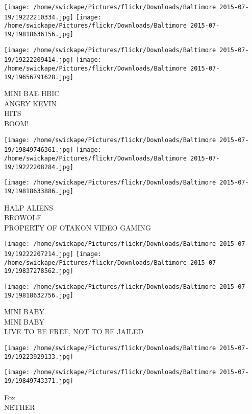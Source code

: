 \documentclass[10pt,letterpaper]{article}
\begin{document}
\texttt{[image: /home/swickape/Pictures/flickr/Downloads/Baltimore 2015-07-19/19222210334.jpg]}
\texttt{[image: /home/swickape/Pictures/flickr/Downloads/Baltimore 2015-07-19/19818636156.jpg]}

\texttt{[image: /home/swickape/Pictures/flickr/Downloads/Baltimore 2015-07-19/19222209414.jpg]}
\texttt{[image: /home/swickape/Pictures/flickr/Downloads/Baltimore 2015-07-19/19656791628.jpg]}

MINI BAE HBIC\\
ANGRY KEVIN\\
HITS\\
BOOM!\\
\pagebreak

\texttt{[image: /home/swickape/Pictures/flickr/Downloads/Baltimore 2015-07-19/19849746361.jpg]}
\texttt{[image: /home/swickape/Pictures/flickr/Downloads/Baltimore 2015-07-19/19222208284.jpg]}

\vspace{0.25in}
\texttt{[image: /home/swickape/Pictures/flickr/Downloads/Baltimore 2015-07-19/19818633886.jpg]}

HALP ALIENS\\
BROWOLF\\
PROPERTY OF OTAKON VIDEO GAMING\\
\pagebreak

\texttt{[image: /home/swickape/Pictures/flickr/Downloads/Baltimore 2015-07-19/19222207214.jpg]}
\texttt{[image: /home/swickape/Pictures/flickr/Downloads/Baltimore 2015-07-19/19837278562.jpg]}

\vspace{0.25in}
\texttt{[image: /home/swickape/Pictures/flickr/Downloads/Baltimore 2015-07-19/19818632756.jpg]}

MINI BABY\\
MINI BABY\\
LIVE TO BE FREE, NOT TO BE JAILED\\
\pagebreak

\texttt{[image: /home/swickape/Pictures/flickr/Downloads/Baltimore 2015-07-19/19223929133.jpg]}

\vspace{0.25in}
\texttt{[image: /home/swickape/Pictures/flickr/Downloads/Baltimore 2015-07-19/19849743371.jpg]}

Fox\\
NETHER\\
\pagebreak
\end{document}
